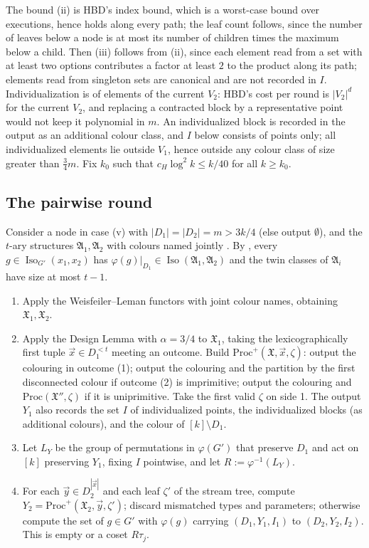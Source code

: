 \documentclass[11pt]{article}
\theoremstyle{definition}
\theoremstyle{remark}
\newcommand{\Iso}{\operatorname{Iso}}
\newcommand{\fA}{\mathfrak A}
\newcommand{\fX}{\mathfrak X}
\begin{document}
The bound (ii) is HBD's index bound, which is a worst-case bound over executions, hence holds along every path; the leaf count follows, since the number of leaves below a node is at most its number of children times the maximum below a child. Then (iii) follows from (ii), since each element read from a set with at least two options contributes a factor at least $2$ to the product along its path; elements read from singleton sets are canonical and are not recorded in $I$. Individualization is of elements of the current $V_2$: HBD's cost per round is $|V_2|^{d}$ for the current $V_2$, and replacing a contracted block by a representative point would not keep it polynomial in $m$. An individualized block is recorded in the output as an additional colour class, and $I$ below consists of points only; all individualized elements lie outside $V_1$, hence outside any colour class of size greater than $\tfrac34m$. Fix $k_0$ such that $c_H\log^2 k\le k/40$ for all $k\ge k_0$.

\subsection{The pairwise round}

Consider a node in case (v) with $|D_1|=|D_2|=m>3k/4$ (else output $\emptyset$), and the $t$-ary structures $\fA_1,\fA_2$ with colours named jointly \cite[App.~A]{GNS}. By \cite[Lemma~6.6]{GNS}, every $g\in\Iso_{G'}(x_1,x_2)$ has $\varphi(g)|_{D_1}\in\Iso(\fA_1,\fA_2)$ and the twin classes of $\fA_i$ have size at most $t-1$.

\begin{enumerate}
\item Apply the Weisfeiler--Leman functors with joint colour names, obtaining $\fX_1,\fX_2$.
\item Apply the Design Lemma with $\alpha=3/4$ to $\fX_1$, taking the lexicographically first tuple $\vec x\in D_1^{<t}$ meeting an outcome. Build $\mathrm{Proc}^+(\fX,\vec x,\zeta)$: output the colouring in outcome (1); output the colouring and the partition by the first disconnected colour if outcome (2) is imprimitive; output the colouring and $\mathrm{Proc}(\fX'',\zeta)$ if it is uniprimitive. Take the first valid $\zeta$ on side 1. The output $Y_1$ also records the set $I$ of individualized points, the individualized blocks (as additional colours), and the colour of $[k]\setminus D_1$.
\item Let $L_Y$ be the group of permutations in $\varphi(G')$ that preserve $D_1$ and act on $[k]$ preserving $Y_1$, fixing $I$ pointwise, and let $R:=\varphi^{-1}(L_Y)$.
\item For each $\vec y\in D_2^{|\vec x|}$ and each leaf $\zeta'$ of the stream tree, compute $Y_2=\mathrm{Proc}^+(\fX_2,\vec y,\zeta')$; discard mismatched types and parameters; otherwise compute the set of $g\in G'$ with $\varphi(g)$ carrying $(D_1,Y_1,I_1)$ to $(D_2,Y_2,I_2)$. This is empty or a coset $R\tau_j$.
\end{enumerate}
\end{document}
